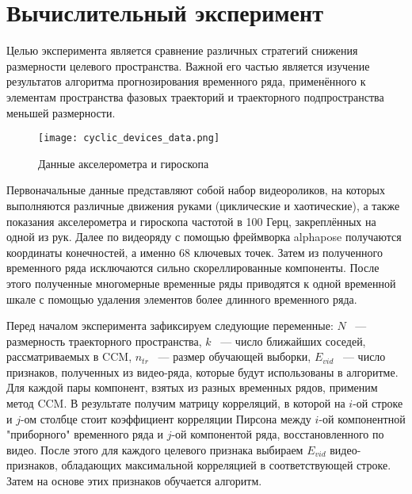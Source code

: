 \documentclass[a4paper, 12pt]{article}
\begin{document}



\section{Вычислительный эксперимент}
Целью эксперимента является сравнение различных стратегий снижения размерности целевого пространства. Важной его частью является изучение результатов алгоритма прогнозирования временного ряда, применённого к элементам пространства фазовых траекторий и траекторного подпространства меньшей размерности.

\begin{figure}[bhtp]
	\texttt{[image: cyclic\_devices\_data.png]}
	\caption{Данные акселерометра и гироскопа}
	\label{fig:devices_data}
\end{figure}
Первоначальные данные представляют собой набор видеороликов, на которых выполняются различные движения руками (циклические и хаотические), а также показания акселерометра и гироскопа частотой в 100 Герц, закреплённых на одной из рук. 
Далее по видеоряду с помощью фреймворка alphapose \citep{alphapose_fang2017rmpe, alphapose_li2018crowdpose, alphapose_xiu2018poseflow} получаются координаты конечностей, а именно 68 ключевых точек. 
Затем из полученного временного ряда исключаются сильно скореллированные компоненты.
После этого полученные многомерные временные ряды приводятся к одной временной шкале с помощью удаления элементов более длинного временного ряда.

Перед началом эксперимента зафиксируем следующие переменные: $N$ ~--- размерность траекторного пространства, $k$ ~--- число ближайших соседей, рассматриваемых в CCM, $n_{tr}$ ~--- размер обучающей выборки, $E_{vid}$ ~--- число признаков, полученных из видео-ряда, которые будут использованы в алгоритме.
Для каждой пары компонент, взятых из разных временных рядов, применим метод CCM.
В результате получим матрицу корреляций, в которой на $i\text{-ой}$ строке и $j\text{-ом}$ столбце стоит коэффициент корреляции Пирсона между $i\text{-ой}$ компонентной "приборного" временного ряда и $j\text{-ой}$ компонентой ряда, восстановленного по видео. 
После этого для каждого целевого признака выбираем $E_{vid}$ видео-признаков, обладающих максимальной корреляцией в соответствующей строке.
Затем на основе этих признаков обучается алгоритм.
\end{document}
